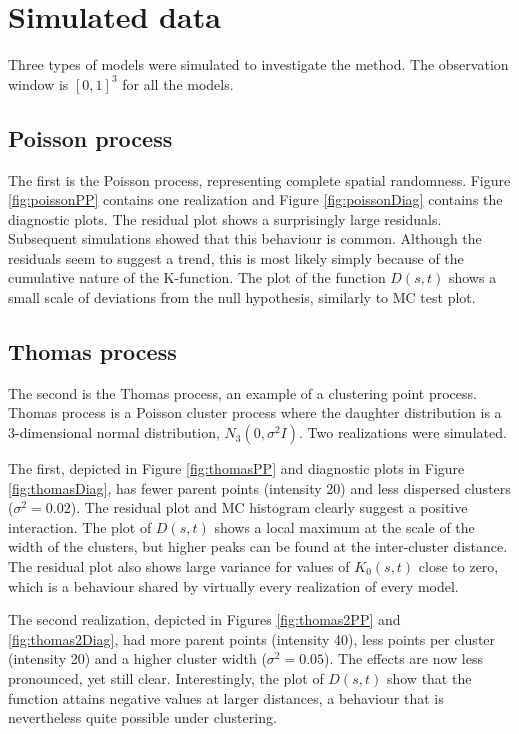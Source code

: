 \documentclass{article}
\begin{document}
\section{Simulated data}

Three types of models were simulated to investigate the method. The observation window is $[0,1]^3$ for all the models.

\subsection{Poisson process}

The first is the Poisson process, representing complete spatial randomness. Figure \ref{fig:poissonPP} contains one realization and Figure \ref{fig:poissonDiag} contains the diagnostic plots. The residual plot shows a surprisingly large residuals. Subsequent simulations showed that this behaviour is common. Although the residuals seem to suggest a trend, this is most likely simply because of the cumulative nature of the K-function. The plot of the function $D(s,t)$ shows a small scale of deviations from the null hypothesis, similarly to MC test plot.


\subsection{Thomas process}
The second is the Thomas process, an example of a clustering point process. Thomas process is a Poisson cluster process where the daughter distribution is a 3-dimensional normal distribution, $N_3(0,\sigma^2 I)$. Two realizations were simulated. 

The first, depicted in Figure \ref{fig:thomasPP} and diagnostic plots in Figure \ref{fig:thomasDiag}, has fewer parent points (intensity 20) and less dispersed clusters ($\sigma^2 = 0.02$). The residual plot and MC histogram clearly suggest a positive interaction. The plot of $D(s,t)$ shows a local maximum at the scale of the width of the clusters, but higher peaks can be found at the inter-cluster distance. The residual plot also shows large variance for values of $K_0(s,t)$ close to zero, which is a behaviour shared by virtually every realization of every model.

The second realization, depicted in Figures \ref{fig:thomas2PP} and  \ref{fig:thomas2Diag}, had more parent points (intensity 40), less points per cluster (intensity 20) and a higher cluster width ($\sigma^2=0.05$). The effects are now less pronounced, yet still clear. Interestingly, the plot of $D(s,t)$ show that the function attains negative values at larger distances, a behaviour that is nevertheless quite possible under clustering.
\end{document}
